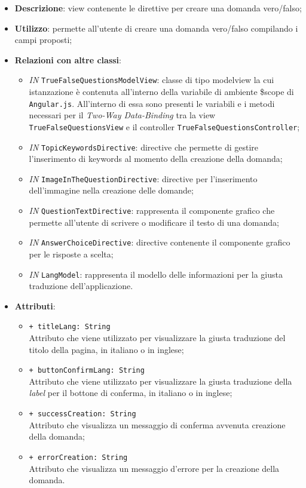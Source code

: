 \begin{itemize}
	\item \textbf{Descrizione}: view contenente le direttive per creare una domanda vero/falso; 
	\item \textbf{Utilizzo}: permette all'utente di creare una domanda vero/falso compilando i campi proposti;
	\item \textbf{Relazioni con altre classi}:
	\begin{itemize}
		\item \textit{IN} \texttt{TrueFalseQuestionsModelView}: classe di tipo modelview la cui istanzazione è contenuta all'interno della variabile di ambiente \$scope di \texttt{Angular.js}. All'interno di essa sono presenti le variabili e i metodi necessari per il \textit{Two-Way Data-Binding} tra la view \texttt{TrueFalseQuestionsView} e il controller \texttt{TrueFalseQuestionsController};
		\item \textit{IN} \texttt{TopicKeywordsDirective}: directive che permette di gestire l'inserimento di keywords al momento della creazione della domanda;
		\item \textit{IN} \texttt{ImageInTheQuestionDirective}: directive per l'inserimento dell'immagine nella creazione delle domande;
		\item \textit{IN} \texttt{QuestionTextDirective}: rappresenta il componente grafico che permette all'utente di scrivere o modificare il testo di una domanda;
		\item \textit{IN} \texttt{AnswerChoiceDirective}: directive contenente il componente grafico per le risposte a scelta;  
		\item \textit{IN} \texttt{LangModel}: rappresenta il modello delle informazioni per la giusta traduzione dell'applicazione.
	\end{itemize}
\item \textbf{Attributi}:
	\begin{itemize}
		\item \texttt{+ titleLang: String} \\ Attributo che viene utilizzato per visualizzare la giusta traduzione del titolo della pagina, in italiano o in inglese;
		\item \texttt{+ buttonConfirmLang: String} \\ Attributo che viene utilizzato per visualizzare la giusta traduzione della \textit{label} per il bottone di conferma, in italiano o in inglese;
		\item \texttt{+ successCreation: String} \\ Attributo che visualizza un messaggio di conferma avvenuta creazione della domanda;
		\item \texttt{+ errorCreation: String} \\ Attributo che visualizza un messaggio d'errore per la creazione della domanda.
	\end{itemize}
\end{itemize}


